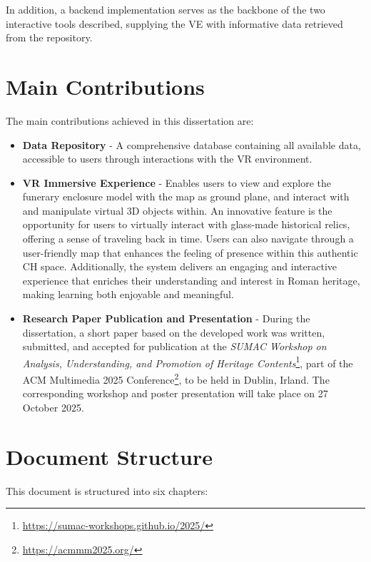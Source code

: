 In addition, a backend implementation serves as the backbone of the two interactive tools described, supplying the \gls{VE} with informative data retrieved from the repository.

\section{Main Contributions}
\label{sec:contributions}

The main contributions achieved in this dissertation are:

\begin{itemize}
   \item  \textbf{Data Repository} - A comprehensive database containing all available data, accessible to users through interactions with the \gls{VR} environment.
   \item \textbf{\gls{VR} Immersive Experience} - Enables users to view and explore the funerary enclosure model with the map as ground plane, and interact with and manipulate virtual \gls{3D} objects within.  An innovative feature is the opportunity for users to virtually interact with glass-made historical relics, offering a sense of traveling back in time. Users can also navigate through a user-friendly map that enhances the feeling of presence within this authentic \gls{CH} space. 
   Additionally, the system delivers an engaging and interactive experience that enriches their understanding and interest in Roman heritage, making learning both enjoyable and meaningful.
   \item \textbf{Research Paper Publication and Presentation} - During the dissertation, a short paper based on the developed work was written, submitted, and accepted for publication at the \textit{SUMAC Workshop on Analysis, Understanding, and Promotion of Heritage Contents}\footnote{\url{https://sumac-workshops.github.io/2025/}}, part of the ACM Multimedia 2025 Conference\footnote{\url{https://acmmm2025.org/}}, to be held in Dublin, Irland. The corresponding workshop and poster presentation will take place on 27 October 2025.
\end{itemize}


\section{Document Structure}
\label{sec:document_structure}

This document is structured into six chapters:

